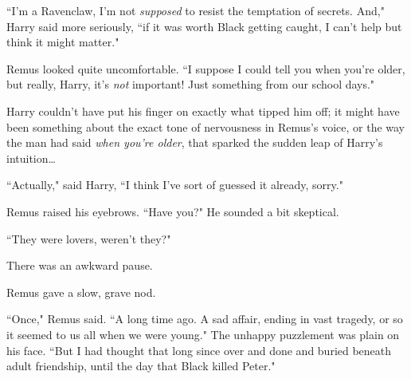 ``I'm a Ravenclaw, I'm not \emph{supposed} to resist the temptation of secrets. And," Harry said more seriously, ``if it was worth Black getting caught, I can't help but think it might matter."

Remus looked quite uncomfortable. ``I suppose I could tell you when you're older, but really, Harry, it's \emph{not} important! Just something from our school days."

Harry couldn't have put his finger on exactly what tipped him off; it might have been something about the exact tone of nervousness in Remus's voice, or the way the man had said \emph{when you're older}, that sparked the sudden leap of Harry's intuition…

``Actually," said Harry, ``I think I've sort of guessed it already, sorry."

Remus raised his eyebrows. ``Have you?" He sounded a bit skeptical.

``They were lovers, weren't they?"

There was an awkward pause.

Remus gave a slow, grave nod.

``Once," Remus said. ``A long time ago. A sad affair, ending in vast tragedy, or so it seemed to us all when we were young." The unhappy puzzlement was plain on his face. ``But I had thought that long since over and done and buried beneath adult friendship, until the day that Black killed Peter."

